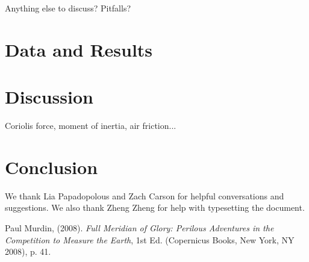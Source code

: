 \documentclass[iop,numberedappendix,appendixfloats]{emulateapj}
\begin{document}
Anything else to discuss?  Pitfalls?










\section{Data and Results}
\label{sec:data}













\section{Discussion}
\label{sec:discuss}

Coriolis force, moment of inertia, air friction...














\section{Conclusion}














\acknowledgments

We thank Lia Papadopolous and Zach Carson for helpful conversations and 
suggestions.  We also thank Zheng Zheng for help with typesetting the 
document.






\begin{thebibliography}{}

\bibitem[]{}
Paul Murdin, (2008). {\it Full Meridian of Glory: Perilous Adventures in the Competition to Measure the Earth}, 1st Ed. (Copernicus Books, New York, NY 2008), p. 41.

\end{thebibliography}{}
\end{document}
